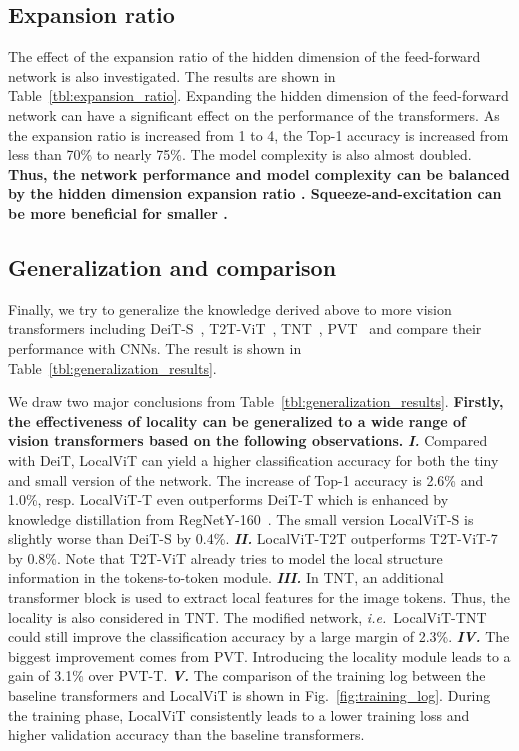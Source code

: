 \documentclass[10pt,twocolumn,letterpaper]{article}
\def\ie{\emph{i.e.\ }}
\begin{document}
\subsection{Expansion ratio }

The effect of the expansion ratio of the hidden dimension of the feed-forward network is also investigated. The results are shown in Table~\ref{tbl:expansion_ratio}. Expanding the hidden dimension of the feed-forward network can have a significant effect on the performance of the transformers. As the expansion ratio is increased from 1 to 4, the Top-1 accuracy is increased from less than 70\% to nearly 75\%. The model complexity is also almost doubled. 
\textbf{Thus, the network performance and model complexity can be balanced by the hidden dimension expansion ratio . Squeeze-and-excitation can be more beneficial for smaller .}


\subsection{Generalization and comparison}

Finally, we try to generalize the knowledge derived above to more vision transformers including DeiT-S~\cite{touvron2020training}, T2T-ViT~\cite{yuan2021tokens}, TNT~\cite{han2021transformer}, PVT~\cite{wang2021pyramid}
and compare their performance with CNNs. The result is shown in Table~\ref{tbl:generalization_results}. 

We draw two major conclusions from Table~\ref{tbl:generalization_results}. \textbf{Firstly, the effectiveness of locality can be generalized to a wide range of vision transformers based on the following observations.} \textbf{\textit{I.}} Compared with DeiT, LocalViT can yield a higher classification accuracy for both the tiny and small version of the network. The increase of Top-1 accuracy is 2.6\% and 1.0\%, resp. LocalViT-T even outperforms DeiT-T which is enhanced by knowledge distillation from RegNetY-160~\cite{radosavovic2020designing}. The small version LocalViT-S is slightly worse than DeiT-S by 0.4\%. \textbf{\textit{II.}} LocalViT-T2T outperforms T2T-ViT-7 by 0.8\%. Note that T2T-ViT already tries to model the local structure information in the tokens-to-token module. \textbf{\textit{III.}} In TNT, an additional transformer block is used to extract local features for the image tokens. Thus, the locality is also considered in TNT. The modified network, \ie LocalViT-TNT could still improve the classification accuracy by a large margin of 2.3\%. \textbf{\textit{IV.}} The biggest improvement comes from PVT. Introducing the locality module leads to a gain of 3.1\% over PVT-T. \textbf{\textit{V.}} The comparison of the training log between the baseline transformers and LocalViT is shown in Fig.~\ref{fig:training_log}. During the training phase, LocalViT consistently leads to a lower training loss and higher validation accuracy than the baseline transformers.
\end{document}
